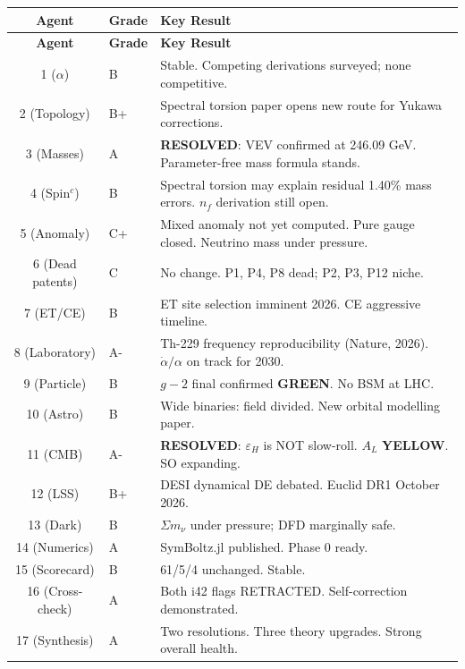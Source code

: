 \documentclass[11pt,a4paper]{article}
\newcommand{\GREEN}{\textcolor{dfdgreen}{\textbf{GREEN}}}
\newcommand{\YELLOW}{\textcolor{dfdyellow}{\textbf{YELLOW}}}
\newcommand{\RESOLVED}{\textcolor{dfdgreen}{\textbf{RESOLVED}}}
\begin{document}
\begin{center}
\begin{longtable}{clp{9cm}}
\toprule
\textbf{Agent} & \textbf{Grade} & \textbf{Key Result} \\
\midrule
\endfirsthead
\toprule
\textbf{Agent} & \textbf{Grade} & \textbf{Key Result} \\
\midrule
\endhead
1 ($\alpha$) & B & Stable. Competing derivations surveyed; none competitive. \\
2 (Topology) & B+ & Spectral torsion paper opens new route for Yukawa corrections. \\
3 (Masses) & A & \RESOLVED{}: VEV confirmed at 246.09 GeV. Parameter-free mass formula stands. \\
4 (Spin$^c$) & B & Spectral torsion may explain residual 1.40\% mass errors. $n_f$ derivation still open. \\
5 (Anomaly) & C+ & Mixed anomaly not yet computed. Pure gauge closed. Neutrino mass under pressure. \\
6 (Dead patents) & C & No change. P1, P4, P8 dead; P2, P3, P12 niche. \\
7 (ET/CE) & B & ET site selection imminent 2026. CE aggressive timeline. \\
8 (Laboratory) & A- & Th-229 frequency reproducibility (Nature, 2026). $\dot{\alpha}/\alpha$ on track for 2030. \\
9 (Particle) & B & $g-2$ final confirmed \GREEN{}. No BSM at LHC. \\
10 (Astro) & B & Wide binaries: field divided. New orbital modelling paper. \\
11 (CMB) & A- & \RESOLVED{}: $\varepsilon_H$ is NOT slow-roll. $A_L$ \YELLOW{}. SO expanding. \\
12 (LSS) & B+ & DESI dynamical DE debated. Euclid DR1 October 2026. \\
13 (Dark) & B & $\Sigma m_\nu$ under pressure; DFD marginally safe. \\
14 (Numerics) & A & SymBoltz.jl published. Phase 0 ready. \\
15 (Scorecard) & B & 61/5/4 unchanged. Stable. \\
16 (Cross-check) & A & Both i42 flags RETRACTED. Self-correction demonstrated. \\
17 (Synthesis) & A & Two resolutions. Three theory upgrades. Strong overall health. \\
\bottomrule
\end{longtable}
\end{center}
\end{document}
